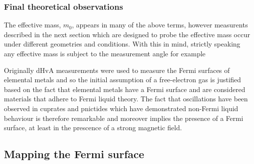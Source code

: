 \subsubsection{Final theoretical observations}

The effective mass, $m_0$, appears in many of the above terms, however measurents described in the next section which are designed to probe the effective mass occur under different geometries and conditions. With this in mind, strictly speaking any effective mass is subject to the measurement angle for example

Originally \ac{dHvA} measurements were used to measure the Fermi surfaces of elemental metals and so the initial assumption of a free-electron gas is justified based on the fact that elemental metals have a Fermi surface and are considered materials that adhere to Fermi liquid theory. The fact that oscillations have been observed in cuprates and pnictides which have demonstrated non-Fermi liquid behaviour is therefore remarkable and moreover implies the presence of a Fermi surface, at least in the prescence of a strong magnetic field.



\subsection{Mapping the Fermi surface}

